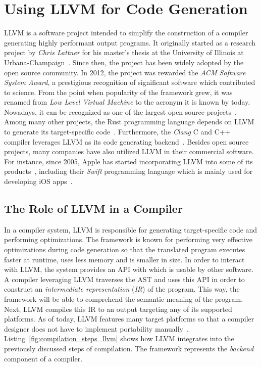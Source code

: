 \newpage
\section{Using LLVM for Code Generation}

LLVM is a software project intended to simplify the construction of a compiler generating highly performant output programs.
It originally started as a research project by \emph{Chris Lattner} for his master's thesis at the University of Illinois at Urbana-Champaign~\cite{Lattner:MSThesis02}.
Since then, the project has been widely adopted by the open source community.
In 2012, the project was rewarded the \emph{ACM Software System Award}, a prestigious recognition of significant software which contributed to science.
From the point when popularity of the framework grew, it was renamed from \emph{Low Level Virtual Machine} to the acronym it is known by today.
Nowadays, it can be recognized as one of the largest open source projects~\cite[preface]{Cardoso_Lopes2014-jt}.
Among many other projects, the Rust programming language depends on LLVM to generate its target-specific code~\cite[p.~373]{McNamara2021-hz}.
Furthermore, the \emph{Clang} C and C++ compiler leverages LLVM as its code generating backend~\cite[preface]{Hsu2021-ez}.
Besides open source projects, many companies have also utilized LLVM in their commercial software.
For instance, since 2005, Apple has started incorporating LLVM into some of its products~\cite[pp.~11-15]{Fandrey}, including their \emph{Swift} programming language which is mainly used for developing iOS apps~\cite[preface]{Hsu2021-ez}.

\subsection{The Role of LLVM in a Compiler}

In a compiler system, LLVM is responsible for generating target-specific code and performing optimizations.
The framework is known for performing very effective optimizations during code generation so that the translated program executes faster at runtime, uses less memory and is smaller in size.
In order to interact with LLVM, the system provides an API with which is usable by other software.
A compiler leveraging LLVM traverses the AST and uses this API in order to construct an \emph{intermediate representation} (\emph{IR}) of the program.
This way, the framework will be able to comprehend the semantic meaning of the program.
Next, LLVM compiles this IR to an output targeting any of its supported platforms.
As of today, LLVM features many target platforms so that a compiler designer does not have to implement portability manually~\cite[preface]{Hsu2021-ez}.
Listing~\ref{fig:compilation_steps_llvm} shows how LLVM integrates into the previously discussed steps of compilation.
The framework represents the \emph{backend} component of a compiler.

